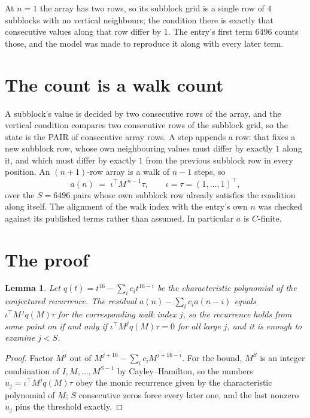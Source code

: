 \documentclass[11pt,a4paper]{article}
\theoremstyle{plain}
\newtheorem{lemma}[theorem]{Lemma}
\theoremstyle{definition}
\begin{document}
At $n=1$ the array has two rows, so its subblock grid is a single row of $4$ subblocks with
no vertical neighbours; the condition there is exactly that consecutive values along that row
differ by $1$. The entry's first term $6496$ counts those, and the model was made to
reproduce it along with every later term.

\section{The count is a walk count}

A subblock's value is decided by two consecutive rows of the array, and the
vertical condition compares two consecutive rows of the subblock grid, so the state is the
PAIR of consecutive array rows. A step appends a row: that fixes a new subblock row, whose own
neighbouring values must differ by exactly $1$ along it, and which must differ by exactly
$1$ from the previous subblock row in every position. An $(n+1)$-row array is a walk of
$n-1$ steps, so
\[
a(n)\;=\;\iota^{\!\top}M^{\,n-1}\tau,\qquad\iota=\tau=(1,\dots,1)^{\!\top},
\]
over the $S=6496$ pairs whose own subblock row already satisfies the condition along itself.
The alignment of the walk index with the entry's own $n$ was checked against its published
terms rather than assumed. In particular $a$ is $C$-finite.

\section{The proof}

\begin{lemma}\label{lem:crit}
Let $q(t)=t^{16}-\sum_i c_it^{16-i}$ be the characteristic polynomial of the
conjectured recurrence. The residual $a(n)-\sum_ic_ia(n-i)$ equals
$\iota^{\!\top}M^{\,j}q(M)\tau$ for the corresponding walk index $j$, so the recurrence
holds from some point on if and only if $\iota^{\!\top}M^{j}q(M)\tau=0$ for all large $j$,
and it is enough to examine $j<S$.
\end{lemma}

\begin{proof}
Factor $M^{j}$ out of $M^{j+16}-\sum_ic_iM^{j+16-i}$. For the bound, $M^{S}$
is an integer combination of $I,M,\dots,M^{S-1}$ by Cayley--Hamilton, so the numbers
$u_j=\iota^{\!\top}M^{j}q(M)\tau$ obey the monic recurrence given by the characteristic
polynomial of $M$; $S$ consecutive zeros force every later one, and the last nonzero $u_j$
pins the threshold exactly.
\end{proof}
\end{document}
